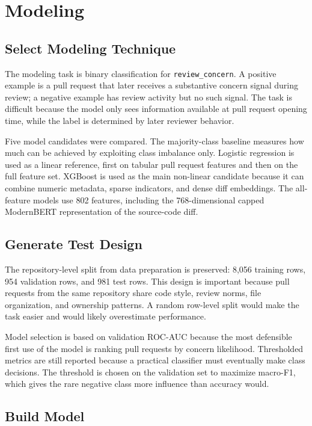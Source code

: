 \section{Modeling}

\subsection{Select Modeling Technique}

The modeling task is binary classification for \texttt{review\_concern}. A positive example is a pull request that later receives a substantive concern signal during review; a negative example has review activity but no such signal. The task is difficult because the model only sees information available at pull request opening time, while the label is determined by later reviewer behavior.

Five model candidates were compared. The majority-class baseline measures how much can be achieved by exploiting class imbalance only. Logistic regression is used as a linear reference, first on tabular pull request features and then on the full feature set. XGBoost is used as the main non-linear candidate because it can combine numeric metadata, sparse indicators, and dense diff embeddings. The all-feature models use 802 features, including the 768-dimensional capped ModernBERT representation of the source-code diff.

\subsection{Generate Test Design}

The repository-level split from data preparation is preserved: 8,056 training rows, 954 validation rows, and 981 test rows. This design is important because pull requests from the same repository share code style, review norms, file organization, and ownership patterns. A random row-level split would make the task easier and would likely overestimate performance.

Model selection is based on validation ROC-AUC because the most defensible first use of the model is ranking pull requests by concern likelihood. Thresholded metrics are still reported because a practical classifier must eventually make class decisions. The threshold is chosen on the validation set to maximize macro-F1, which gives the rare negative class more influence than accuracy would.

\subsection{Build Model}

